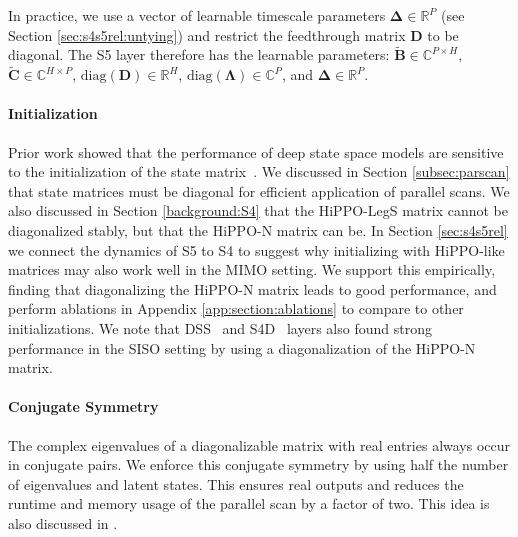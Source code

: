 In practice, we use a vector of learnable timescale parameters $\mathbf{\Delta}\in \mathbb{R}^P$ (see Section \ref{sec:s4s5rel:untying}) and restrict the feedthrough matrix $\mathbf{D}$ to be diagonal.  The S5 layer therefore has the learnable parameters:  $\tilde{\mathbf{B}}\in \mathbb{C}^{P \times H}$, $\tilde{\mathbf{C}}\in \mathbb{C}^{H \times P}$, $\mathrm{diag}(\mathbf{D})\in \mathbb{R}^{H}$,  $\mathrm{diag}(\mathbf{\Lambda}) \in \mathbb{C}^{P}$, and $\mathbf{\Delta}\in \mathbb{R}^P$. 

\paragraph{Initialization}
Prior work showed that the performance of deep state space models are sensitive to the initialization of the state matrix~\citep{gu2021lssl, gu2021s4}.  We discussed in Section \ref{subsec:parscan} that state matrices must be diagonal for efficient application of parallel scans.  We also discussed in Section \ref{background:S4} that the HiPPO-LegS matrix cannot be diagonalized stably, but that the HiPPO-N matrix can be.  In Section \ref{sec:s4s5rel} we connect the dynamics of S5 to S4 to suggest why initializing with HiPPO-like matrices may also work well in the MIMO setting.  We support this empirically, finding that diagonalizing the HiPPO-N matrix leads to good performance, and perform ablations in Appendix \ref{app:section:ablations} to compare to other initializations.  We note that DSS~\citep{gupta2022dss} and S4D~\citep{gu2022parameterization} layers also found strong performance in the SISO setting by using a diagonalization of the HiPPO-N matrix.

\paragraph{Conjugate Symmetry} The complex eigenvalues of a diagonalizable matrix with real entries always occur in conjugate pairs.  We enforce this conjugate symmetry by using half the number of eigenvalues and latent states. This ensures real outputs and reduces the runtime and memory usage of the parallel scan by a factor of two.  This idea is also discussed in \citet{gu2022parameterization}. 

